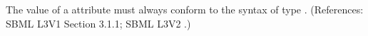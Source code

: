 The value of a  attribute must always conform to the syntax
of type .  (References: SBML L3V1 Section 3.1.1; SBML L3V2 .)
